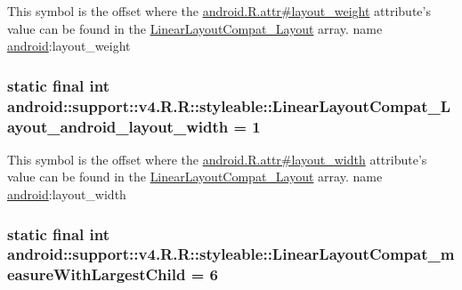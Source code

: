 This symbol is the offset where the \hyperlink{}{android.R.attr\#layout\_\-weight} attribute's value can be found in the \hyperlink{classandroid_1_1support_1_1v4_1_1_r_1_1styleable_a8dc84dfe6c307db75f05c4257866884}{LinearLayoutCompat\_\-Layout} array.  name \hyperlink{namespaceandroid}{android}:layout\_\-weight \hypertarget{classandroid_1_1support_1_1v4_1_1_r_1_1styleable_133e851e27e11681c8f244c2550bc0a7}{
\subsubsection[{LinearLayoutCompat\_\-Layout\_\-android\_\-layout\_\-width}]{\setlength{\rightskip}{0pt plus 5cm}static final int android::support::v4.R.R::styleable::LinearLayoutCompat\_\-Layout\_\-android\_\-layout\_\-width = 1}}
\label{classandroid_1_1support_1_1v4_1_1_r_1_1styleable_133e851e27e11681c8f244c2550bc0a7}


This symbol is the offset where the \hyperlink{}{android.R.attr\#layout\_\-width} attribute's value can be found in the \hyperlink{classandroid_1_1support_1_1v4_1_1_r_1_1styleable_a8dc84dfe6c307db75f05c4257866884}{LinearLayoutCompat\_\-Layout} array.  name \hyperlink{namespaceandroid}{android}:layout\_\-width \hypertarget{classandroid_1_1support_1_1v4_1_1_r_1_1styleable_8b8d65edcdf29ccafcc0df613960971f}{
\subsubsection[{LinearLayoutCompat\_\-measureWithLargestChild}]{\setlength{\rightskip}{0pt plus 5cm}static final int android::support::v4.R.R::styleable::LinearLayoutCompat\_\-measureWithLargestChild = 6}}
\label{classandroid_1_1support_1_1v4_1_1_r_1_1styleable_8b8d65edcdf29ccafcc0df613960971f}



